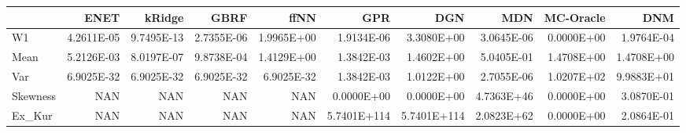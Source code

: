 \begin{tabular}{lrrrrrrrrr}
\toprule
{} &       ENET &     kRidge &       GBRF &       ffNN &         GPR &         DGN &        MDN &  MC-Oracle &        DNM \\
\midrule
W1       & 4.2611E-05 & 9.7495E-13 & 2.7355E-06 & 1.9965E+00 &  1.9134E-06 &  3.3080E+00 & 3.0645E-06 & 0.0000E+00 & 1.9764E-04 \\
Mean     & 5.2126E-03 & 8.0197E-07 & 9.8738E-04 & 1.4129E+00 &  1.3842E-03 &  1.4602E+00 & 5.0405E-01 & 1.4708E+00 & 1.4708E+00 \\
Var      & 6.9025E-32 & 6.9025E-32 & 6.9025E-32 & 6.9025E-32 &  1.3842E-03 &  1.0122E+00 & 2.7055E-06 & 1.0207E+02 & 9.9883E+01 \\
Skewness &        NAN &        NAN &        NAN &        NAN &  0.0000E+00 &  0.0000E+00 & 4.7363E+46 & 0.0000E+00 & 3.0870E-01 \\
Ex\_Kur   &        NAN &        NAN &        NAN &        NAN & 5.7401E+114 & 5.7401E+114 & 2.0823E+62 & 0.0000E+00 & 2.0864E-01 \\
\bottomrule
\end{tabular}

